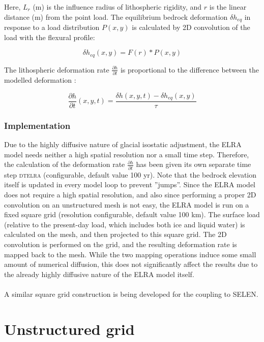 \documentclass{article}
\begin{document}
Here, $L_r$ (m) is the influence radius of lithospheric rigidity, and $r$ is the linear distance (m) from the point load. The equilibrium bedrock deformation $\delta h_{eq}$ in response to a load distribution $P(x,y)$ is calculated by 2D convolution of the load with the flexural profile:

\begin{equation}
\delta h_{eq} (x,y) = F(r) \ast P(x,y)
\end{equation}

The lithospheric deformation rate $\frac{\partial h}{\partial t}$ is proportional to the difference between the modelled deformation :

\begin{equation}
\frac{\partial h}{\partial t} (x,y,t) = \frac{\delta h (x,y,t) - \delta h_{eq} (x,y)}{\tau}
\end{equation}

\subsubsection{Implementation}

Due to the highly diffusive nature of glacial isostatic adjustment, the ELRA model needs neither a high spatial resolution nor a small time step. Therefore, the calculation of the deformation rate $\frac{\partial h}{\partial t}$ has been given its own separate time step \textsc{dt\textunderscore elra} (configurable, default value 100 yr). Note that the bedrock elevation itself is updated in every model loop to prevent ''jumps''. Since the ELRA model does not require a high spatial resolution, and also since performing a proper 2D convolution on an unstructured mesh is not easy, the ELRA model is run on a fixed square grid (resolution configurable, default value 100 km). The surface load (relative to the present-day load, which includes both ice and liquid water) is calculated on the mesh, and then projected to this square grid. The 2D convolution is performed on the grid, and the resulting deformation rate is mapped back to the mesh. While the two mapping operations induce some small amount of numerical diffusion, this does not significantly affect the results due to the already highly diffusive nature of the ELRA model itself.\\
\\
A similar square grid construction is being developed for the coupling to SELEN.

\newpage
\section{Unstructured grid}
\end{document}
